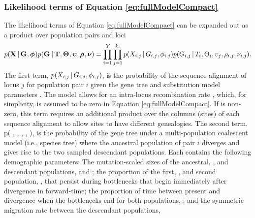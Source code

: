 \subsubsection*{Likelihood terms of Equation \ref{eq:fullModelCompact}}
\begin{linenomath}
The likelihood terms of Equation \ref{eq:fullModelCompact} can
be expanded out as a product over population pairs and loci
\begin{equation}
    p(\alignmentVector \given \geneTreeVector, \hkyModelVector)
    p(\geneTreeVector \given \divTimeMapVector, \demographicParamVector,
    \locusMutationRateScalarVector, \ploidyScalarVector,
    \mutationRateScalarConstantVector) = 
    \prod_{i=1}^{\npairs{}}
    \prod_{j=1}^{\nloci{i}}
    p(\alignment{i}{j} \given \geneTree{i}{j}, \hkyModel{i}{j})
    p(\geneTree{i}{j} \given \divTimeMap{i}, \demographicParams{i},
    \locusMutationRateScalar{j}, \ploidyScalar{i}{j},
    \mutationRateScalarConstant{i}{j}).
    \label{eq:modelLikelihoodExpanded}
\end{equation}
The first term,
$p(\alignment{i}{j} \given \geneTree{i}{j}, \hkyModel{i}{j})$,
is the probability of the sequence alignment of locus $j$ for population pair
$i$ given the gene tree and \hky substitution model parameters \citep[i.e., the
``Felsenstein likelihood'';][]{Felsenstein1981}.
The model allows for an intra-locus recombination rate \recombinationRate,
which, for simplicity, is assumed to be zero in Equation
\ref{eq:fullModelCompact}.
If \recombinationRate is non-zero, this term requires an additional product
over the columns (sites) of each sequence alignment to allow sites to have
different genealogies.
The second term,
p( \given {}, ,
, ,
),
is the probability of the gene tree under a multi-population coalescent model
(i.e., species tree) where the ancestral population of pair $i$ diverges
and gives rise to the two sampled descendant populations.
Each \demographicParams{} contains the following demographic parameters:
The mutation-scaled sizes of the ancestral, \ancestralTheta{}, and descendant
populations,  and ;
the proportion of the first, , and second population,
, that persist during bottlenecks that begin immediately
after divergence in forward-time;
the proportion of time between present and divergence when the bottlenecks
end for both populations, \bottleTime{};
and the symmetric migration rate between the descendant populations,

\end{linenomath}
